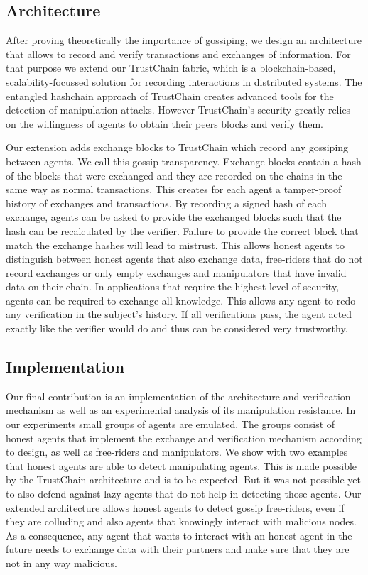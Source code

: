 \subsection{Architecture}
After proving theoretically the importance of gossiping, we design an architecture that allows to 
record and verify transactions and exchanges of information. For that purpose we extend our
TrustChain fabric, which is a blockchain-based, scalability-focussed solution for recording 
interactions in distributed systems. The entangled hashchain approach of TrustChain creates advanced
tools for the detection of manipulation attacks. However TrustChain's security greatly relies on the
willingness of agents to obtain their peers blocks and verify them. 

Our extension adds exchange blocks to TrustChain which record any gossiping between agents. We call
this gossip transparency.
Exchange blocks contain a hash of the blocks that were exchanged and they are recorded on the chains
in the same way as normal transactions. This creates for each agent a tamper-proof history of exchanges and
transactions. By recording a signed hash of each exchange, agents can be asked to provide the exchanged
blocks such that the hash can be recalculated by the verifier. Failure to provide the correct block that
match the exchange hashes will lead to mistrust. This allows honest agents to distinguish
between honest agents that also exchange data, free-riders that do not record exchanges or only empty
exchanges and manipulators that have invalid data on their chain. In applications that require the 
highest level of security, agents can be required to exchange all knowledge. This allows any agent 
to redo any verification in the subject's history. If all verifications pass, the agent acted exactly
like the verifier would do and thus can be considered very trustworthy.

\subsection{Implementation}
Our final contribution is an implementation of the architecture and verification mechanism as well as
an experimental analysis of its manipulation resistance. In our experiments small groups of agents 
are emulated. The groups consist of honest agents that implement the exchange and verification 
mechanism according to design, as well as free-riders and manipulators. We show with two examples
that honest agents are able to detect manipulating agents. This is made possible by the TrustChain 
architecture and is to be expected. But it was not possible yet to also defend against lazy agents
that do not help in detecting those agents. Our extended architecture allows honest agents to 
detect gossip free-riders, even if they are colluding and also agents that knowingly interact with
malicious nodes. As a consequence, any agent that wants to interact with an honest agent in the future
needs to exchange data with their partners and make sure that they are not in any way malicious.

